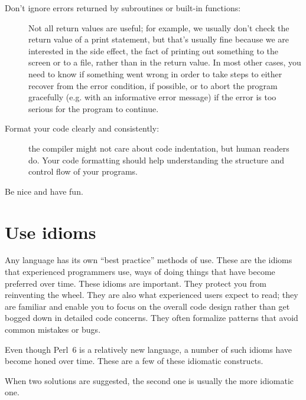 \begin{description}
\item[Don't ignore errors returned by subroutines or built-in 
functions:] Not all return values are useful; for example, we 
usually don't check the return value of a print statement, but 
that's usually fine because we are interested in the side effect, 
the fact of printing out something to the screen or to a file, 
rather than in the return value. In most other cases, you need 
to know if something went wrong in order to take steps to either 
recover from the error condition, if possible, or to abort the 
program gracefully (e.g. with an informative error message) if 
the error is too serious for the program to continue.

\item[Format your code clearly and consistently:] the compiler 
might not care about code indentation, but human readers do. 
Your code formatting should help understanding the structure and 
control flow of your programs.

\item[Be nice and have fun.]

\end{description}

\section{Use idioms}

Any language has its own ``best practice'' methods of use. 
These are the idioms that experienced programmers use, ways of doing 
things that have become preferred over time. These idioms are important. 
They protect you from reinventing the wheel. They are also what 
experienced users expect to read; they are familiar 
and enable you to focus on the overall code design rather than
get bogged down in detailed code concerns. They often formalize 
patterns that avoid common mistakes or bugs.

Even though Perl~6 is a relatively new language, a number of such idioms 
have become honed over time. These are a few of these idiomatic 
constructs.

When two solutions are suggested, the second one is usually the 
more idiomatic one.

